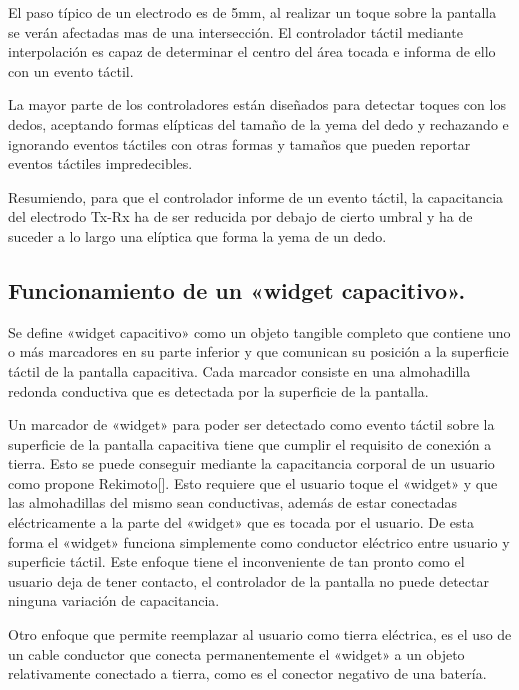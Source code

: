 El paso típico de un electrodo es de 5mm, al realizar un toque sobre la pantalla se verán afectadas mas de una intersección. El controlador táctil mediante interpolación es capaz de determinar el centro del área tocada e informa de ello con un evento táctil.

La mayor parte de los controladores están diseñados para detectar toques con los dedos, aceptando formas elípticas del tamaño de la yema del dedo y rechazando e ignorando eventos táctiles con otras formas y tamaños que pueden reportar eventos táctiles impredecibles.

Resumiendo, para que el controlador informe de un evento táctil, la capacitancia del electrodo Tx-Rx ha de ser reducida por debajo de cierto umbral y ha de suceder a lo largo una elíptica que forma la yema de un dedo.


\subsection{Funcionamiento de un «widget capacitivo».}

Se define «widget capacitivo» como un objeto tangible completo que contiene uno o más marcadores en su parte inferior y que comunican su posición a la superficie táctil de la pantalla capacitiva. Cada marcador consiste en una almohadilla redonda conductiva que es detectada por la superficie de la pantalla.

Un marcador de «widget» para poder ser detectado como evento táctil sobre la superficie de la pantalla capacitiva tiene que cumplir el requisito de conexión a tierra. Esto se puede conseguir mediante la capacitancia corporal de un usuario como propone Rekimoto[]. Esto requiere que el usuario toque el «widget» y que las almohadillas del mismo sean conductivas, además de estar conectadas eléctricamente a la parte del «widget» que es tocada por el usuario. De esta forma el «widget» funciona simplemente como conductor eléctrico entre usuario y superficie táctil. Este enfoque tiene el inconveniente de tan pronto como el usuario deja de tener contacto, el controlador de la pantalla no puede detectar ninguna variación de capacitancia.

Otro enfoque que permite reemplazar al usuario como tierra eléctrica, es el uso de un cable conductor que conecta permanentemente el «widget» a un objeto relativamente conectado a tierra, como es el conector negativo de una batería.






